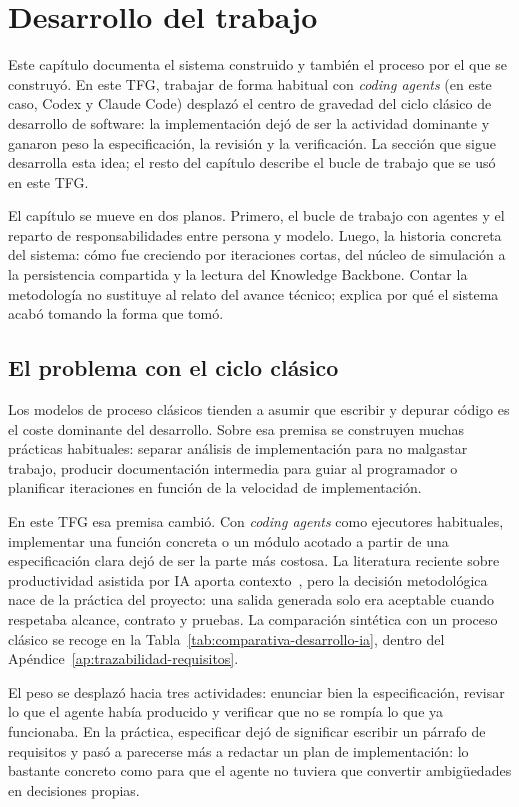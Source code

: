 \chapter{Desarrollo del trabajo}

Este capítulo documenta el sistema construido y también el proceso
por el que se construyó. En este TFG, trabajar de forma habitual con
\textit{coding agents} (en este caso, Codex y Claude Code) desplazó el
centro de gravedad del ciclo clásico de desarrollo de software: la
implementación dejó de ser la actividad dominante y ganaron peso la
especificación, la revisión y la verificación. La sección que sigue desarrolla
esta idea; el resto del capítulo describe el bucle de trabajo que se usó en
este TFG.

El capítulo se mueve en dos planos. Primero, el bucle de trabajo con agentes
y el reparto de responsabilidades entre persona y modelo. Luego, la historia
concreta del sistema: cómo fue creciendo por iteraciones cortas, del núcleo de
simulación a la persistencia compartida y la lectura del Knowledge Backbone.
Contar la metodología no sustituye al relato del avance técnico; explica por
qué el sistema acabó tomando la forma que tomó.

\section{El problema con el ciclo clásico}

Los modelos de proceso clásicos tienden a asumir que escribir y depurar código
es el coste dominante del desarrollo. Sobre esa premisa se construyen muchas
prácticas habituales: separar análisis de implementación para no malgastar
trabajo, producir documentación intermedia para guiar al programador o
planificar iteraciones en función de la velocidad de implementación.

En este TFG esa premisa cambió. Con \textit{coding agents} como ejecutores
habituales, implementar una función concreta o un módulo acotado a partir de una
especificación clara dejó de ser la parte más costosa. La literatura reciente
sobre productividad asistida por IA aporta contexto~\cite{cui2025effects,butler2024dear},
pero la decisión metodológica nace de la práctica del proyecto: una salida
generada solo era aceptable cuando respetaba alcance, contrato y pruebas. La
comparación sintética con un proceso clásico se recoge en la
Tabla~\ref{tab:comparativa-desarrollo-ia}, dentro del
Apéndice~\ref{ap:trazabilidad-requisitos}.

El peso se desplazó hacia tres actividades: enunciar bien la especificación,
revisar lo que el agente había producido y verificar que no se rompía lo que ya
funcionaba. En la práctica, especificar dejó de significar escribir un párrafo
de requisitos y pasó a parecerse más a redactar un plan de implementación: lo
bastante concreto como para que el agente no tuviera que convertir
ambigüedades en decisiones propias.

